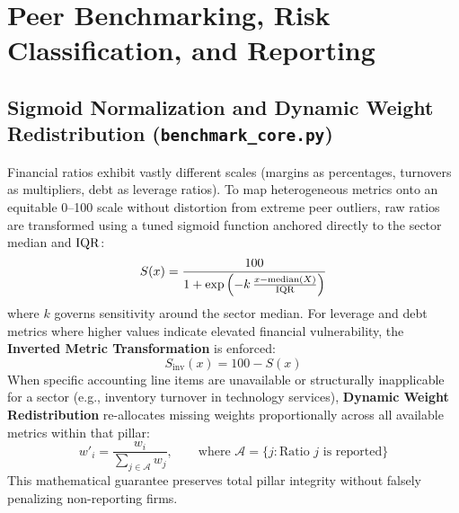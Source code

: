 
\section{Peer Benchmarking, Risk Classification, and Reporting}

\subsection{Sigmoid Normalization and Dynamic Weight Redistribution (\texttt{benchmark\_core.py})}
Financial ratios exhibit vastly different scales (margins as percentages, turnovers as multipliers, debt as leverage ratios). To map heterogeneous metrics onto an equitable 0--100 scale without distortion from extreme peer outliers, raw ratios are transformed using a tuned sigmoid function anchored directly to the sector median and $\operatorname{IQR}$:
\begin{equation}
    S(x) = \frac{100}{1 + \exp\left(-k\,\frac{x - \operatorname{median}(X)}{\operatorname{IQR}}\right)}
\end{equation}
where $k$ governs sensitivity around the sector median. For leverage and debt metrics where higher values indicate elevated financial vulnerability, the \textbf{Inverted Metric Transformation} is enforced:
\begin{equation}
    S_{\text{inv}}(x) = 100 - S(x)
\end{equation}
When specific accounting line items are unavailable or structurally inapplicable for a sector (e.g., inventory turnover in technology services), \textbf{Dynamic Weight Redistribution} re-allocates missing weights proportionally across all available metrics within that pillar:
\begin{equation}
    w'_i = \frac{w_i}{\sum_{j \in \mathcal{A}} w_j}, \qquad \text{where } \mathcal{A} = \{j : \text{Ratio } j \text{ is reported}\}
\end{equation}
This mathematical guarantee preserves total pillar integrity without falsely penalizing non-reporting firms.

